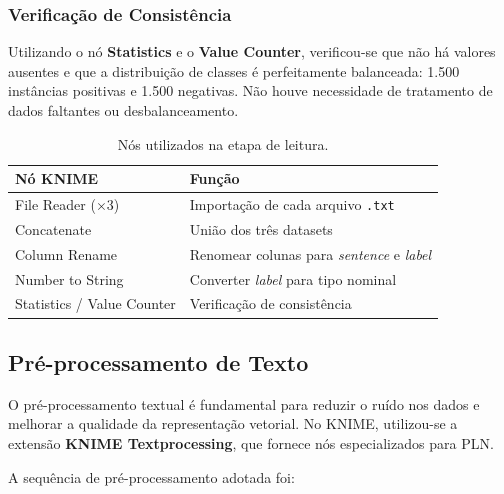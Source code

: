 \documentclass[12pt,a4paper]{article}
\begin{document}
\subsubsection*{Verificação de Consistência}

Utilizando o nó \textbf{Statistics} e o \textbf{Value Counter}, verificou-se que não há valores ausentes e que a distribuição de classes é perfeitamente balanceada: 1.500 instâncias positivas e 1.500 negativas. Não houve necessidade de tratamento de dados faltantes ou desbalanceamento.

\begin{table}[H]
\centering
\caption{Nós utilizados na etapa de leitura.}
\label{tab:nos-leitura}
\begin{tabular}{ll}
\toprule
\textbf{Nó KNIME} & \textbf{Função} \\
\midrule
File Reader ($\times$3) & Importação de cada arquivo \texttt{.txt} \\
Concatenate & União dos três datasets \\
Column Rename & Renomear colunas para \textit{sentence} e \textit{label} \\
Number to String & Converter \textit{label} para tipo nominal \\
Statistics / Value Counter & Verificação de consistência \\
\bottomrule
\end{tabular}
\end{table}

\subsection{Pré-processamento de Texto}

O pré-processamento textual é fundamental para reduzir o ruído nos dados e melhorar a qualidade da representação vetorial. No KNIME, utilizou-se a extensão \textbf{KNIME Textprocessing}, que fornece nós especializados para PLN.

A sequência de pré-processamento adotada foi:
\end{document}
